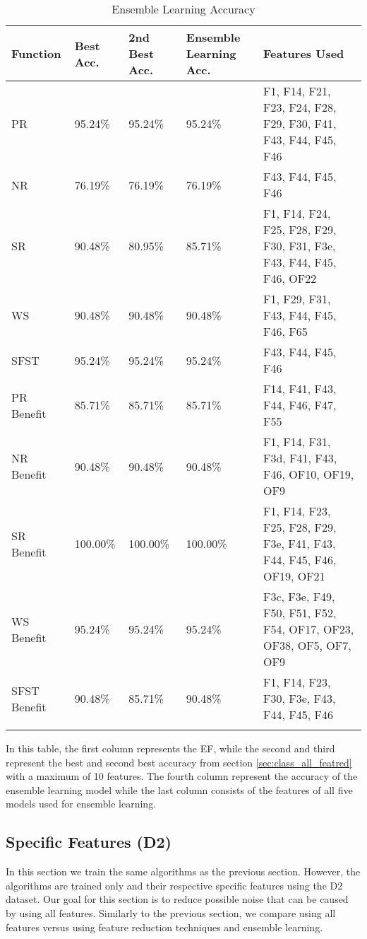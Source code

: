 \documentclass[12pt,letterpaper]{article}
\begin{document}
\begin{longtable}{|p{2cm}|p{2cm}|p{2cm}|p{2cm}|p{6cm}|}
\hline
\textbf{Function} & \textbf{Best Acc.} & \textbf{2nd Best Acc.} & \textbf{Ensemble Learning Acc.} & \textbf{Features Used} \\ \hline
PR & 95.24\% & 95.24\% & 95.24\% & F1, F14, F21, F23, F24, F28, F29, F30, F41, F43, F44, F45, F46 \\ \hline
NR & 76.19\% & 76.19\% & 76.19\% & F43, F44, F45, F46 \\ \hline
SR & 90.48\% & 80.95\% & 85.71\% & F1, F14, F24, F25, F28, F29, F30, F31, F3e, F43, F44, F45, F46, OF22 \\ \hline
WS & 90.48\% & 90.48\% & 90.48\% & F1, F29, F31, F43, F44, F45, F46, F65 \\ \hline
SFST & 95.24\% & 95.24\% & 95.24\% & F43, F44, F45, F46 \\ \hline
PR Benefit & 85.71\% & 85.71\% & 85.71\% & F14, F41, F43, F44, F46, F47, F55 \\ \hline
NR Benefit & 90.48\% & 90.48\% & 90.48\% & F1, F14, F31, F3d, F41, F43, F46, OF10, OF19, OF9 \\ \hline
SR Benefit & 100.00\% & 100.00\% & 100.00\% & F1, F14, F23, F25, F28, F29, F3e, F41, F43, F44, F45, F46, OF19, OF21 \\ \hline
WS Benefit & 95.24\% & 95.24\% & 95.24\% & F3c, F3e, F49, F50, F51, F52, F54, OF17, OF23, OF38, OF5, OF7, OF9 \\ \hline
SFST Benefit & 90.48\% & 85.71\% & 90.48\% & F1, F14, F23, F30, F3e, F43, F44, F45, F46 \\ \hline
\caption{Ensemble Learning Accuracy}
\label{tab_class_all:ensemble_reduction_class}
\end{longtable}
In this table, the first column represents the \ac{EF}, while the second and third represent the best and second best accuracy from section \ref{sec:class_all_featred} with a maximum of 10 features.
The fourth column represent the accuracy of the ensemble learning model while the last column consists of the features of all five models used for ensemble learning.


\subsection{Specific Features (D2)}\label{sec:class_spec}
In this section we train the same algorithms as the previous section.
However, the algorithms are trained only and their respective specific features using the D2 dataset.
Our goal for this section is to reduce possible noise that can be caused by using all features.
Similarly to the previous section, we compare using all features versus using feature reduction techniques and ensemble learning.
\end{document}
